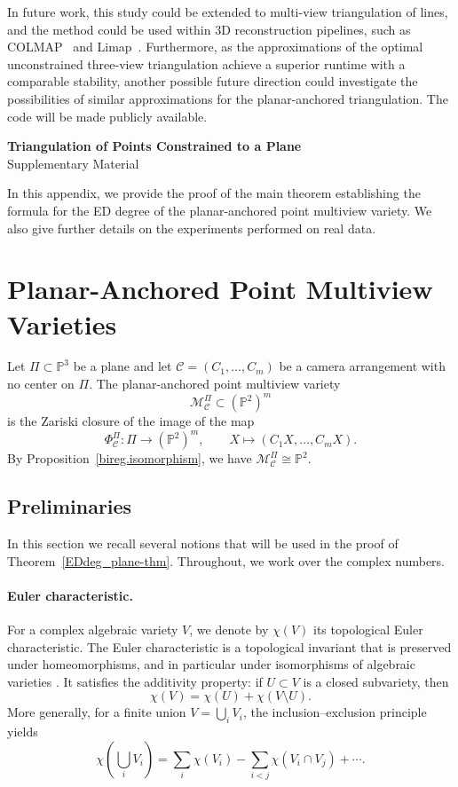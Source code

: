 \documentclass{article}
\newcommand{\PP}{\mathbb{P}}
\begin{document}
In future work, this study could be extended to multi-view triangulation of lines, and the method could be used within 3D reconstruction pipelines, such as COLMAP~\cite{schoenberger2016sfm} and Limap~\cite{Liu_2023_LIMAP}. Furthermore, as the approximations \cite{DBLP:conf/3dim/KukelovaPB13,DBLP:conf/cvpr/HedborgRF14} of the optimal unconstrained three-view triangulation \cite{DBLP:conf/accv/ByrodJA07} achieve a superior runtime with a comparable stability, another possible future direction could investigate the possibilities of similar approximations for the planar-anchored triangulation. The code will be made publicly available.

\printbibliography

\newpage
\appendix

\begin{center}
{\Large \textbf{Triangulation of Points Constrained to a Plane}}\\[2ex]
{\large Supplementary Material\\[2ex]
}
\vspace*{2ex}
\end{center}

\noindent
In this appendix, we provide the proof of the main theorem establishing the formula for the ED degree of the planar-anchored point multiview variety. We also give further details on the experiments performed on real data.
\section{Planar-Anchored Point Multiview Varieties}
Let $\Pi\subset\PP^3$ be a plane and let
$\mathcal C=(C_1,\dots,C_m)$ be a camera arrangement with no center on
$\Pi$.  The planar-anchored point multiview variety
\[
\mathcal M^\Pi_{\mathcal C}\subset(\PP^2)^m
\]
is the Zariski closure of the image of the map
\[
\Phi^\Pi_{\mathcal C}:\Pi\to(\PP^2)^m,
\qquad
X\mapsto (C_1X,\dots,C_mX).
\]
By Proposition~\ref{bireg.isomorphism}, we have $\mathcal M^\Pi_{\mathcal C}\cong\PP^2$.
\subsection{Preliminaries}

In this section we recall several notions that will be used in the proof of
Theorem~\ref{EDdeg_plane-thm}.  Throughout, we work over the complex numbers.

\paragraph{Euler characteristic.}
For a complex algebraic variety $V$, we denote by $\chi(V)$ its topological Euler characteristic. The Euler characteristic is a topological invariant that is preserved under homeomorphisms, and in particular under isomorphisms of algebraic varieties \cite{hatcher2005algebraic}. 
It satisfies the additivity property: if $U \subset V$ is a closed subvariety, then
\[
\chi(V) = \chi(U) + \chi(V \setminus U).
\]
More generally, for a finite union $V=\bigcup_i V_i$, the inclusion--exclusion principle yields
\[
\chi\!\left(\bigcup_i V_i\right)
=
\sum_i \chi(V_i)
-\sum_{i<j}\chi(V_i\cap V_j)
+\cdots .
\]
\end{document}

